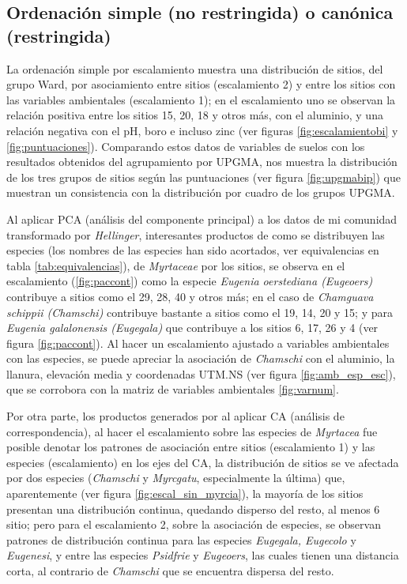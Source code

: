 \documentclass[11pt,]{article}
\begin{document}
\subsection{Ordenación simple (no restringida) o canónica
(restringida)}\label{ordenaciuxf3n-simple-no-restringida-o-canuxf3nica-restringida}

La ordenación simple por escalamiento muestra una distribución de
sitios, del grupo Ward, por asociamiento entre sitios (escalamiento 2) y
entre los sitios con las variables ambientales (escalamiento 1); en el
escalamiento uno se observan la relación positiva entre los sitios 15,
20, 18 y otros más, con el aluminio, y una relación negativa con el pH,
boro e incluso zinc (ver figuras \ref{fig:escalamientobi} y
\ref{fig:puntuaciones}). Comparando estos datos de variables de suelos
con los resultados obtenidos del agrupamiento por UPGMA, nos muestra la
distribución de los tres grupos de sitios según las puntuaciones (ver
figura \ref{fig:upgmabip}) que muestran un consistencia con la
distribución por cuadro de los grupos UPGMA.

Al aplicar PCA (análisis del componente principal) a los datos de mi
comunidad transformado por \emph{Hellinger}, interesantes productos de
como se distribuyen las especies (los nombres de las especies han sido
acortados, ver equivalencias en tabla \ref{tab:equivalencias}), de
\emph{Myrtaceae} por los sitios, se observa en el escalamiento
(\ref{fig:paccont}) como la especie \emph{Eugenia oerstediana
(Eugeoers)} contribuye a sitios como el 29, 28, 40 y otros más; en el
caso de \emph{Chamguava schippii (Chamschi)} contribuye bastante a
sitios como el 19, 14, 20 y 15; y para \emph{Eugenia galalonensis
(Eugegala)} que contribuye a los sitios 6, 17, 26 y 4 (ver figura
\ref {fig:paccont}). Al hacer un escalamiento ajustado a variables
ambientales con las especies, se puede apreciar la asociación de
\emph{Chamschi} con el aluminio, la llanura, elevación media y
coordenadas UTM.NS (ver figura \ref{fig:amb_esp_esc}), que se corrobora
con la matriz de variables ambientales \ref {fig:varnum}.

Por otra parte, los productos generados por al aplicar CA (análisis de
correspondencia), al hacer el escalamiento sobre las especies de
\emph{Myrtacea} fue posible denotar los patrones de asociación entre
sitios (escalamiento 1) y las especies (escalamiento) en los ejes del
CA, la distribución de sitios se ve afectada por dos especies
(\emph{Chamschi} y \emph{Myrcgatu}, especialmente la última) que,
aparentemente (ver figura \ref{fig:escal_sin_myrcia}), la mayoría de los
sitios presentan una distribución continua, quedando disperso del resto,
al menos 6 sitio; pero para el escalamiento 2, sobre la asociación de
especies, se observan patrones de distribución continua para las
especies \emph{Eugegala, Eugecolo} y \emph{Eugenesi}, y entre las
especies \emph{Psidfrie} y \emph{Eugeoers}, las cuales tienen una
distancia corta, al contrario de \emph{Chamschi} que se encuentra
dispersa del resto.
\end{document}
